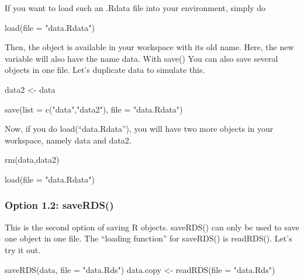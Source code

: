 \documentclass[
]{article}
\newenvironment{Shaded}{\begin{snugshade}}{\end{snugshade}}
\newcommand{\AttributeTok}[1]{\textcolor[rgb]{0.77,0.63,0.00}{#1}}
\newcommand{\FunctionTok}[1]{\textcolor[rgb]{0.00,0.00,0.00}{#1}}
\newcommand{\NormalTok}[1]{#1}
\newcommand{\OtherTok}[1]{\textcolor[rgb]{0.56,0.35,0.01}{#1}}
\newcommand{\StringTok}[1]{\textcolor[rgb]{0.31,0.60,0.02}{#1}}
\begin{document}
If you want to load such an .Rdata file into your environment, simply do

\begin{Shaded}
\begin{Highlighting}[]
\FunctionTok{load}\NormalTok{(}\AttributeTok{file =} \StringTok{"data.Rdata"}\NormalTok{)}
\end{Highlighting}
\end{Shaded}

Then, the object is available in your workspace with its old name. Here,
the new variable will also have the name data. With save() You can also
save several objects in one file. Let's duplicate data to simulate this.

\begin{Shaded}
\begin{Highlighting}[]
\NormalTok{data2 }\OtherTok{\textless{}{-}}\NormalTok{ data}

\FunctionTok{save}\NormalTok{(}\AttributeTok{list =} \FunctionTok{c}\NormalTok{(}\StringTok{"data"}\NormalTok{,}\StringTok{"data2"}\NormalTok{), }\AttributeTok{file =} \StringTok{"data.Rdata"}\NormalTok{)}
\end{Highlighting}
\end{Shaded}

Now, if you do load(``data.Rdata''), you will have two more objects in
your workspace, namely data and data2.

\begin{Shaded}
\begin{Highlighting}[]
\FunctionTok{rm}\NormalTok{(data,data2)}

\FunctionTok{load}\NormalTok{(}\AttributeTok{file =} \StringTok{"data.Rdata"}\NormalTok{)}
\end{Highlighting}
\end{Shaded}

\hypertarget{option-1.2-saverds}{%
\subsubsection{Option 1.2: saveRDS()}\label{option-1.2-saverds}}

This is the second option of saving R objects. saveRDS() can only be
used to save one object in one file. The ``loading function'' for
saveRDS() is readRDS(). Let's try it out.

\begin{Shaded}
\begin{Highlighting}[]
\FunctionTok{saveRDS}\NormalTok{(data, }\AttributeTok{file =} \StringTok{"data.Rds"}\NormalTok{)}
\NormalTok{data.copy }\OtherTok{\textless{}{-}} \FunctionTok{readRDS}\NormalTok{(}\AttributeTok{file =} \StringTok{"data.Rds"}\NormalTok{)}
\end{Highlighting}
\end{Shaded}
\end{document}
